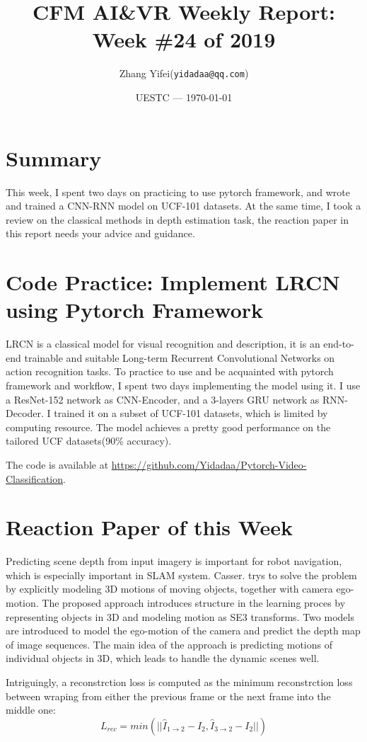\documentclass{article}
\title{CFM AI\&VR Weekly Report: Week \#24 of 2019}
\author{Zhang Yifei(\texttt{yidadaa@qq.com})}
\date{UESTC --- \today}
\begin{document}
\maketitle

\section{Summary}
This week, I spent two days on practicing to use pytorch framework, and wrote and trained a CNN-RNN model on UCF-101 datasets. At the same time, I took a review on the classical methods in depth estimation task, the reaction paper in this report needs your advice and guidance.

\section{Code Practice: Implement LRCN using Pytorch Framework}
LRCN\cite{lrcn2014} is a classical model for visual recognition and description, it is an end-to-end trainable and suitable Long-term Recurrent Convolutional Networks on action recognition tasks. To practice to use and be acquainted with pytorch framework and workflow, I spent two days implementing the model using it. I use a ResNet-152 network as CNN-Encoder, and a 3-layers GRU network as RNN-Decoder. I trained it on a subset of UCF-101 datasets, which is limited by computing resource. The model achieves a pretty good performance on the tailored UCF datasets(90\% accuracy). 

The code is available at \url{https://github.com/Yidadaa/Pytorch-Video-Classification}.

\section{Reaction Paper of this Week}
Predicting scene depth from input imagery is important for robot navigation, which is especially important in SLAM system.
Casser. \cite{casser_depth_2018} trys to solve the problem by explicitly modeling 3D motions of moving objects, together with camera ego-motion. The proposed approach introduces structure in the learning proces by representing objects in 3D and modeling motion as SE3 transforms. Two models are introduced to model the ego-motion of the camera and predict the depth map of image sequences. The main idea of the approach is predicting motions of individual objects in 3D, which leads to handle the dynamic scenes well.

Intriguingly, a reconstrction loss is computed as the minimum reconstrction loss between wraping from either the previous frame or the next frame into the middle one:
$$L_{rec}=min(||\hat{I}_{1\rightarrow 2}-I_2, \hat{I}_{3\rightarrow 2}-I_2||)$$
\end{document}
